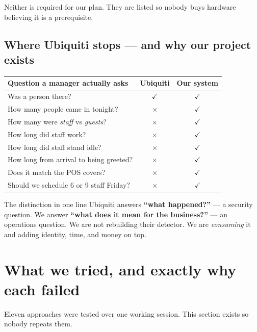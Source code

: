 \documentclass[11pt,a4paper]{article}
\newcommand{\tick}{\textcolor{ok}{$\checkmark$}}
\newcommand{\cross}{\textcolor{bad}{$\times$}}
\begin{document}
Neither is required for our plan. They are listed so nobody buys hardware
believing it is a prerequisite.

\subsection{Where Ubiquiti stops --- and why our project exists}

\begin{center}
\begin{tabular}{@{}p{6.6cm}cc@{}}
\toprule
\textbf{Question a manager actually asks} & \textbf{Ubiquiti} & \textbf{Our system} \\
\midrule
Was a person there?                        & \tick & \tick \\
How many people came in tonight?           & \cross & \tick \\
How many were \emph{staff} vs \emph{guests}? & \cross & \tick \\
How long did staff work?                   & \cross & \tick \\
How long did staff stand idle?             & \cross & \tick \\
How long from arrival to being greeted?    & \cross & \tick \\
Does it match the POS covers?              & \cross & \tick \\
Should we schedule 6 or 9 staff Friday?    & \cross & \tick \\
\bottomrule
\end{tabular}
\end{center}

\begin{note}{The distinction in one line}
Ubiquiti answers \textbf{``what happened?''} --- a security question.
We answer \textbf{``what does it mean for the business?''} --- an
operations question. We are not rebuilding their detector. We are
\emph{consuming} it and adding identity, time, and money on top.
\end{note}

\section{What we tried, and exactly why each failed}

Eleven approaches were tested over one working session. This section exists
so nobody repeats them.
\end{document}
